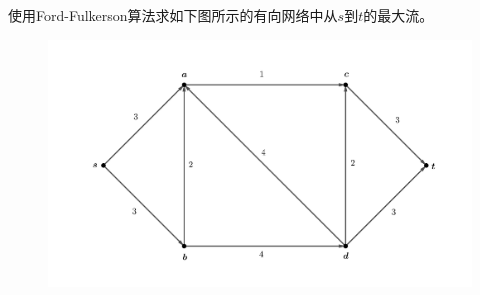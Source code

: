 \documentclass[lang = cn, scheme = chinese, thmcnt = section]{elegantbook}
\begin{document}
\begin{example}
	使用Ford-Fulkerson算法求如下图所示的有向网络中从$s$到$t$的最大流。
	\begin{figure}[H]
		\centering
		\includegraphics[scale = 0.15]{../图/13.2.1}
	\end{figure}
\end{example}
\end{document}
